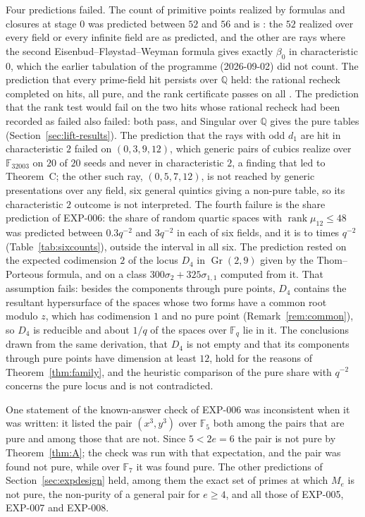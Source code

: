 \documentclass[11pt]{article}
\theoremstyle{definition}
\theoremstyle{remark}
\newcommand{\EXP}[1]{\mbox{EXP-#1}}
\newcommand{\Q}{\mathbb{Q}}
\newcommand{\F}{\mathbb{F}}
\begin{document}
Four predictions failed. The count of primitive points realized by formulas and closures at stage 0 was predicted between $52$ and $56$ and is \nstageZeroRealized{}: the $52$ realized over every field or every infinite field are as predicted, and the other \nstageZeroWeyman{} are rays where the second Eisenbud--Fl{\o}ystad--Weyman formula gives exactly $\beta_0$ in characteristic $0$, which the earlier tabulation of the programme (2026-09-02) did not count. The prediction that every prime-field hit persists over $\Q$ held: the rational recheck completed on \nqqOk{} hits, all pure, and the rank certificate passes on all \nfourHits{}. The prediction that the rank test would fail on the two hits whose rational recheck had been recorded as failed also failed: both pass, and Singular over $\Q$ gives the pure tables (Section~\ref{sec:lift-results}). The prediction that the rays with odd $d_1$ are hit in characteristic $2$ failed on $(0,3,9,12)$, which generic pairs of cubics realize over $\F_{32003}$ on $20$ of $20$ seeds and never in characteristic $2$, a finding that led to Theorem~C; the other such ray, $(0,5,7,12)$, is not reached by generic presentations over any field, six general quintics giving a non-pure table, so its characteristic $2$ outcome is not interpreted. The fourth failure is the share prediction of \EXP{006}: the share of random quartic spaces with $\operatorname{rank}\mu_{12}\le48$ was predicted between $0.3q^{-2}$ and $3q^{-2}$ in each of six fields, and it is \nsixRatioMin{} to \nsixRatioMax{} times $q^{-2}$ (Table~\ref{tab:sixcounts}), outside the interval in all six. The prediction rested on the expected codimension $2$ of the locus $D_4$ in $\operatorname{Gr}(2,9)$ given by the Thom--Porteous formula, and on a class $300\sigma_2+325\sigma_{1,1}$ computed from it. That assumption fails: besides the components through pure points, $D_4$ contains the resultant hypersurface of the spaces whose two forms have a common root modulo $z$, which has codimension $1$ and no pure point (Remark~\ref{rem:common}), so $D_4$ is reducible and about $1/q$ of the spaces over $\F_q$ lie in it. The conclusions drawn from the same derivation, that $D_4$ is not empty and that its components through pure points have dimension at least $12$, hold for the reasons of Theorem~\ref{thm:family}, and the heuristic comparison of the pure share with $q^{-2}$ concerns the pure locus and is not contradicted.

One statement of the known-answer check of \EXP{006} was inconsistent when it was written: it listed the pair $(x^3,y^3)$ over $\F_5$ both among the pairs that are pure and among those that are not. Since $5<2e=6$ the pair is not pure by Theorem~\ref{thm:A}; the check was run with that expectation, and the pair was found not pure, while over $\F_7$ it was found pure. The other predictions of Section~\ref{sec:expdesign} held, among them the exact set of primes at which $M_e$ is not pure, the non-purity of a general pair for $e\ge4$, and all those of \EXP{005}, \EXP{007} and \EXP{008}.
\end{document}
